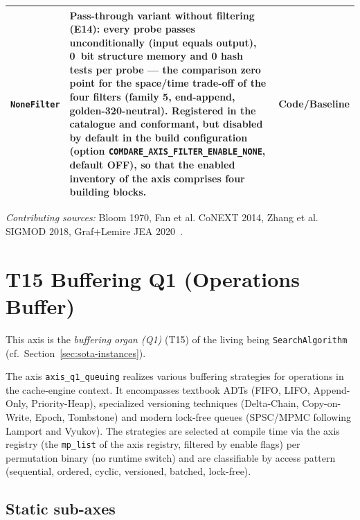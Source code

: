 \begin{scriptsize}
\begin{longtable}{@{}>{\raggedright\arraybackslash}p{2.6cm} >{\raggedright\arraybackslash}p{7.4cm} >{\raggedright\arraybackslash}p{3.5cm}@{}}
\texttt{None\allowbreak{}Filter} & Pass-through variant without filtering (E14): every probe passes unconditionally (input equals output), 0~bit structure memory and 0 hash tests per probe --- the comparison zero point for the space/time trade-off of the four filters (family 5, end-append, golden-320-neutral). Registered in the catalogue and conformant, but disabled by default in the build configuration (option \texttt{COMDARE\_\allowbreak{}AXIS\_\allowbreak{}FILTER\_\allowbreak{}ENABLE\_\allowbreak{}NONE}, default OFF), so that the enabled inventory of the axis comprises four building blocks. & Code/\allowbreak{}Baseline \\
\bottomrule
\end{longtable}
\end{scriptsize}

\emph{Contributing sources:} Bloom 1970, Fan et al. Co\allowbreak{}NEXT 2014, Zhang et al. SIGMOD 2018, Graf+Lemire JEA 2020~\cite{bloom1970,fan2014cuckoo,zhang2018surf,graf2020xor}.

\section{T15 Buffering Q1 (Operations Buffer)}

This axis is the \emph{buffering organ (Q1)} (T15) of the living being \texttt{SearchAlgorithm} (cf.\ Section~\ref{sec:sota-instances}).

The axis \texttt{axis\_\allowbreak{}q1\_\allowbreak{}queuing} realizes various buffering strategies for operations in the cache-engine context. It encompasses textbook ADTs (FIFO, LIFO, Append-Only, Priority-Heap), specialized versioning techniques (Delta-Chain, Copy-on-Write, Epoch, Tombstone) and modern lock-free queues (SPSC/\allowbreak{}MPMC following Lamport and Vyukov). The strategies are selected at compile time via the axis registry (the \texttt{mp\_list} of the axis registry, filtered by enable flags) per permutation binary (no runtime switch) and are classifiable by access pattern (sequential, ordered, cyclic, versioned, batched, lock-free).

\subsection*{Static sub-axes}

